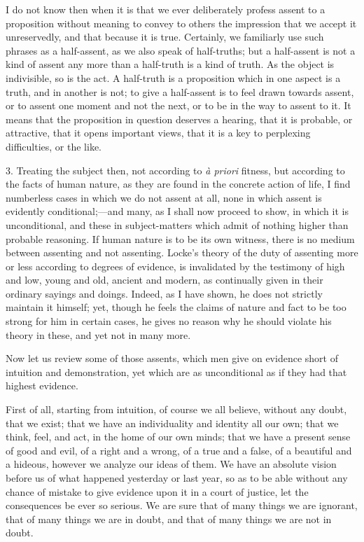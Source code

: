 I do not know then when it is that we ever deliberately profess
assent to a proposition without meaning to convey to others the
impression that we accept it unreservedly, and that because it is
true. Certainly, we familiarly use such phrases as a half-assent, as
we also speak of half-truths; but a half-assent is not a kind of
assent any more than a half-truth is a kind of truth. As the object is
indivisible, so is the act. A half-truth is a proposition which
in one aspect is a truth, and in another is not; to give a half-assent
is to feel drawn towards assent, or to assent one moment and not the
next, or to be in the way to assent to it. It means that the
proposition in question deserves a hearing, that it is probable, or
attractive, that it opens important views, that it is a key to
perplexing difficulties, or the like.

3. Treating the subject then, not according to \emph{à priori}
fitness, but according to the facts of human nature, as they are found
in the concrete action of life, I find numberless cases in which we do
not assent at all, none in which assent is evidently conditional;—and
many, as I shall now proceed to show, in which it is unconditional,
and these in subject-matters which admit of nothing higher than
probable reasoning. If human nature is to be its own witness, there is
no medium between assenting and not assenting. Locke's theory of the
duty of assenting more or less according to degrees of evidence, is
invalidated by the testimony of high and low, young and old, ancient
and modern, as continually given in their ordinary sayings and doings.
Indeed, as I have shown, he does not strictly maintain it himself;
yet, though he feels the claims of nature and fact to be too strong
for him in certain cases, he gives no reason why he should violate his
theory in these, and yet not in many more.

Now let us review some of those assents, which men give on evidence
short of intuition and demonstration, yet which are as unconditional
as if they had that highest evidence.

First of all, starting from intuition, of course we all believe,
without any doubt, that we exist; that we have an individuality and
identity all our own; that we think, feel, and act, in the home of our
own minds; that we have a present sense of good and evil, of a right
and a wrong, of a true and a false, of a beautiful and a hideous,
however we analyze our ideas of them. We have an absolute vision
before us of what happened yesterday or last year, so as to be able
without any chance of mistake to give evidence upon it in a court of
justice, let the consequences be ever so serious. We are sure that of
many things we are ignorant, that of many things we are in doubt, and
that of many things we are not in doubt.

